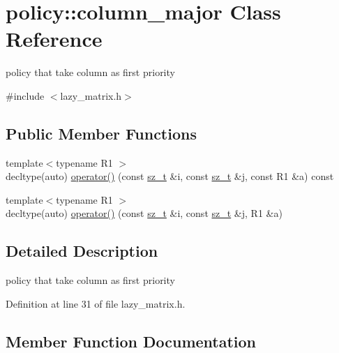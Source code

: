 \hypertarget{classpolicy_1_1column__major}{}\section{policy\+::column\+\_\+major Class Reference}
\label{classpolicy_1_1column__major}


policy that take column as first priority  




{\ttfamily \#include $<$lazy\+\_\+matrix.\+h$>$}

\subsection*{Public Member Functions}
\begin{DoxyCompactItemize}
\item 
{\footnotesize template$<$typename R1 $>$ }\\decltype(auto) \mbox{\hyperlink{classpolicy_1_1column__major_a50967f3227d359e7580934667dae30b0}{operator()}} (const \mbox{\hyperlink{lazy__matrix_8h_acba2745dcfc55b2d05ff45adc6a0a015}{sz\+\_\+t}} \&i, const \mbox{\hyperlink{lazy__matrix_8h_acba2745dcfc55b2d05ff45adc6a0a015}{sz\+\_\+t}} \&j, const R1 \&a) const
\item 
{\footnotesize template$<$typename R1 $>$ }\\decltype(auto) \mbox{\hyperlink{classpolicy_1_1column__major_a3f273113d234f459e1723679d2064127}{operator()}} (const \mbox{\hyperlink{lazy__matrix_8h_acba2745dcfc55b2d05ff45adc6a0a015}{sz\+\_\+t}} \&i, const \mbox{\hyperlink{lazy__matrix_8h_acba2745dcfc55b2d05ff45adc6a0a015}{sz\+\_\+t}} \&j, R1 \&a)
\end{DoxyCompactItemize}


\subsection{Detailed Description}
policy that take column as first priority 

Definition at line 31 of file lazy\+\_\+matrix.\+h.



\subsection{Member Function Documentation}
\mbox{\label{classpolicy_1_1column__major_a50967f3227d359e7580934667dae30b0}} 
